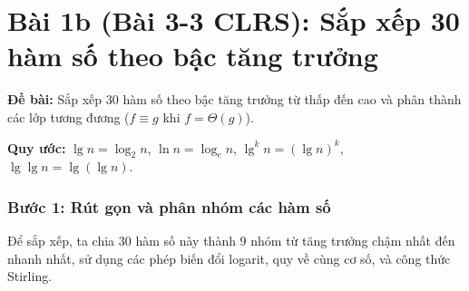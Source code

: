 \documentclass[12pt,a4paper]{article}
\begin{document}
\section*{Bài 1b (Bài 3-3 CLRS): Sắp xếp 30 hàm số theo bậc tăng trưởng}

\textbf{Đề bài:} Sắp xếp 30 hàm số theo bậc tăng trưởng từ thấp đến cao và phân thành các lớp tương đương ($f \equiv g$ khi $f = \Theta(g)$).

\textbf{Quy ước:} $\lg n = \log_2 n$, \; $\ln n = \log_e n$, \; $\lg^k n = (\lg n)^k$, \; $\lg\lg n = \lg(\lg n)$.

\subsubsection*{Bước 1: Rút gọn và phân nhóm các hàm số}

Để sắp xếp, ta chia 30 hàm số này thành 9 nhóm từ tăng trưởng chậm nhất đến nhanh nhất, sử dụng các phép biến đổi logarit, quy về cùng cơ số, và công thức Stirling.
\end{document}
